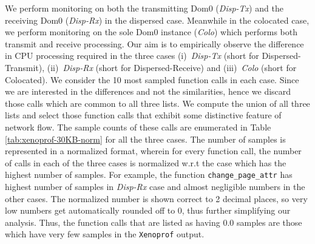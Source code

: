 We perform monitoring on both the transmitting Dom0 (\textit{Disp-Tx})
and the receiving Dom0 (\textit{Disp-Rx}) in the dispersed case. 
Meanwhile in the colocated case, we perform monitoring on the 
sole Dom0
instance (\textit{Colo}) which performs both transmit and receive processing.
Our aim is to empirically observe the 
difference in CPU processing required in the three cases
\textemdash{}(i)~\textit{Disp-Tx} (short for Dispersed-Transmit), 
(ii)~\textit{Disp-Rx} (short for Dispersed-Receive) and 
(iii)~\textit{Colo} (short for Colocated).
We consider the 10 most sampled function calls in each case.
Since we are interested in the differences and not the similarities, hence
we discard those calls which are common to all three lists. 
We compute the union of all three lists and select those function
calls that exhibit some distinctive feature of network flow.
The sample counts of these calls are enumerated in Table 
\ref{tab:xenoprof-30KB-norm} for all the three
cases.
The number of samples is represented in a
normalized format, wherein for every function call, the number
of calls in each of the three cases is normalized w.r.t the
case which
has the highest number of samples. For example, the function
\texttt{change\_page\_attr} has highest number of samples
in \textit{Disp-Rx} case and almost negligible numbers in the other
cases. The normalized number is shown correct to 2 decimal 
places, so very low numbers get automatically rounded off to 0,
thus further simplifying our analysis. Thus, the function calls
that are listed as having 0.0 samples are those which have very 
few samples in the \texttt{Xenoprof} output.


